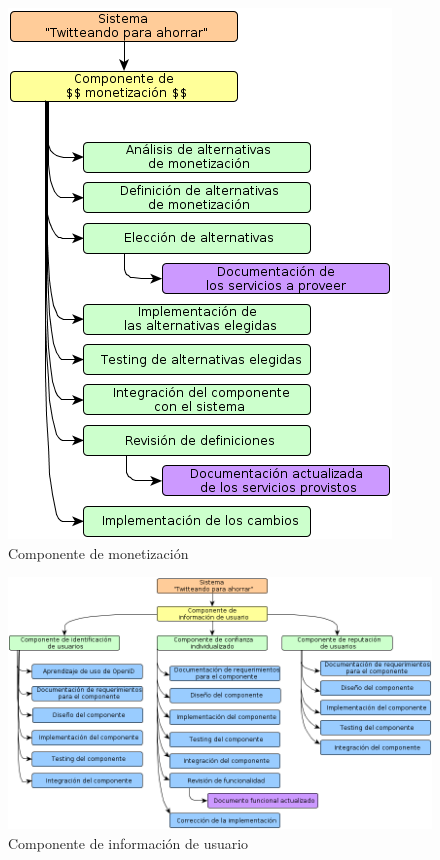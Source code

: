 \documentclass[10pt, a4paper]{article}
\newcommand{\escaladefault}{0.85}
\begin{document}
\begin{figure}[H]
\centering
\includegraphics[scale=\escaladefault]{graficos/wbs/comp_monetizacion.png}
\caption{Componente de monetización}
\end{figure}

\begin{figure}[H]
\centering
\includegraphics[scale=\escaladefault]{graficos/wbs/comp_de_info_de_usuario.png}
\caption{Componente de información de usuario}
\end{figure}
\end{document}
